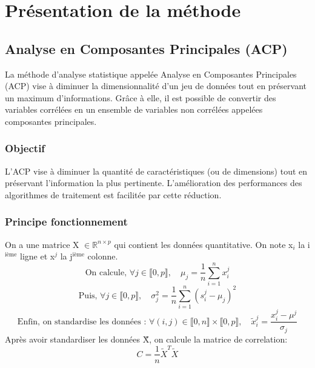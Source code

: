 \documentclass[a4paper,12pt]{article}
\begin{document}

\section{Présentation de la méthode}
\label{sec:presentation2}
\subsection{Analyse en Composantes Principales (ACP)}

La méthode d'analyse statistique appelée Analyse en Composantes Principales (ACP) vise à diminuer la dimensionnalité d'un jeu de données tout en préservant un maximum d'informations. Grâce à elle, il est possible de convertir des variables corrélées en un ensemble de variables non corrélées appelées composantes principales.\\

\subsubsection{Objectif}

L'ACP vise à diminuer la quantité de caractéristiques (ou de dimensions) tout en préservant l'information la plus pertinente. L'amélioration des performances des algorithmes de traitement est facilitée par cette réduction. \\

\subsubsection{Principe fonctionnement}

On a une matrice X $ \in \mathbb{R}^{n\times p}$ qui contient les données quantitative. On note x$_i$ la i$^{\text{ième}}$ ligne et x$^j$ la j$^{\text{ième}}$ colonne.\\

\begin{equation}
  \text{On calcule, } \forall j \in \llbracket 0, p \rrbracket, \quad \mu_j = \frac{1}{n} \sum_{i=1}^nx_i^j
\end{equation}
\begin{equation}
  \text{Puis, } \forall j \in \llbracket 0, p \rrbracket, \quad \sigma_j^2 = \frac{1}{n} \sum_{i =1}^n (s_i^j - \mu_j )^2
\end{equation}
\begin{equation}
  \text{Enfin, on standardise les données : } \forall (i, j) \in \llbracket 0, n \rrbracket \times \llbracket 0, p \rrbracket, \quad \tilde{x}_i^j = \frac{ x_i^j - \mu^j}{\sigma_j}
\end{equation}
\vspace{10pt}
Après avoir standardiser les données \~X, on calcule la matrice de correlation:
\begin{equation}
  C = \frac{1}{n}\tilde{X}^T\tilde{X}
\end{equation}
\end{document}
